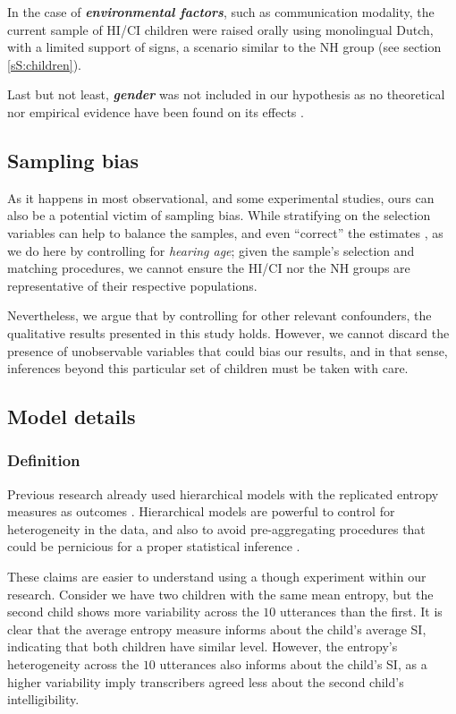 In the case of \textbf{\textit{environmental factors}}, such as communication modality, the current sample of HI/CI children were raised orally using monolingual Dutch, with a limited support of signs, a scenario similar to the NH group (see section \ref{sS:children}).

Last but not least, \textbf{\textit{gender}} was not included in our hypothesis as no theoretical nor empirical evidence have been found on its effects \cite{Boonen_et_al_2021}.
%
%
\subsection{Sampling bias} \label{sSA:sampling_bias}
%
As it happens in most observational, and some experimental studies, ours can also be a potential victim of sampling bias. While stratifying on the selection variables can help to balance the samples, and even ``correct'' the estimates \cite{Cinelli_et_al_2021, Deffner_et_al_2022}, as we do here by controlling for \textit{hearing age}; given the sample's selection and matching procedures, we cannot ensure the HI/CI nor the NH groups are representative of their respective populations. 

Nevertheless, we argue that by controlling for other relevant confounders, the qualitative results presented in this study holds. However, we cannot discard the presence of unobservable variables that could bias our results, and in that sense, inferences beyond this particular set of children must be taken with care.
%
%
\subsection{Model details} \label{sSA:model_details}
%
\subsubsection{Definition} \label{ssSA:model_definition}
%
Previous research already used hierarchical models with the replicated entropy measures as outcomes \citep{Boonen_et_al_2021, Faes_et_al_2021}. Hierarchical models are powerful to control for heterogeneity in the data, and also to avoid pre-aggregating procedures that could be pernicious for a proper statistical inference \citep{McElreath_2020}. 

These claims are easier to understand using a though experiment within our research. Consider we have two children with the same mean entropy, but the second child shows more variability across the $10$ utterances than the first. It is clear that the average entropy measure informs about the child's average SI, indicating that both children have similar level. However, the entropy's heterogeneity across the $10$ utterances also informs about the child's SI, as a higher variability imply transcribers agreed less about the second child's intelligibility.

